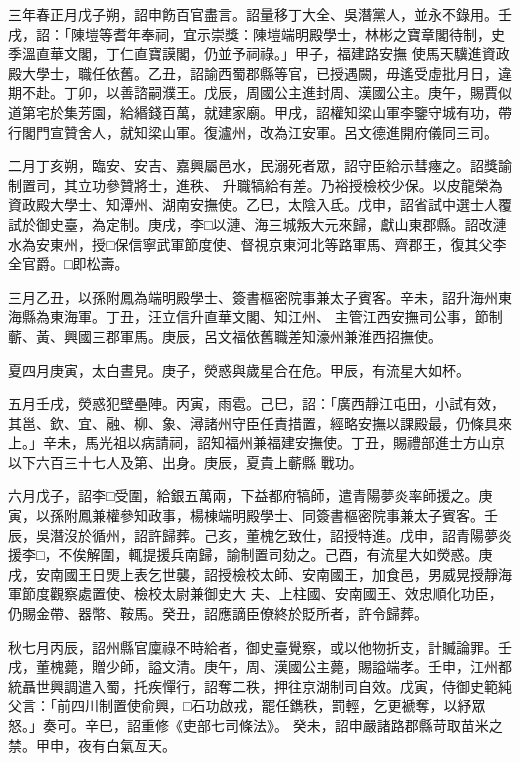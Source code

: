 \begin{pinyinscope}
 三年春正月戊子朔，詔申飭百官盡言。詔量移丁大全、吳潛黨人，並永不錄用。壬戌，詔：「陳塏等耆年奉祠，宜示崇獎：陳塏端明殿學士，林彬之寶章閣待制，史季溫直華文閣，丁仁直寶謨閣，仍並予祠祿。」甲子，福建路安撫
 使馬天驥進資政殿大學士，職任依舊。乙丑，詔諭西蜀郡縣等官，已授遇闕，毋遙受虛批月日，違期不赴。丁卯，以善諮嗣濮王。戊辰，周國公主進封周、漢國公主。庚午，賜賈似道第宅於集芳園，給緡錢百萬，就建家廟。甲戌，詔權知梁山軍李鑒守城有功，帶行閣門宣贊舍人，就知梁山軍。復瀘州，改為江安軍。呂文德進開府儀同三司。



 二月丁亥朔，臨安、安吉、嘉興屬邑水，民溺死者眾，詔守臣給示彗瘞之。詔獎諭制置司，其立功參贊將士，進秩、
 升職犒給有差。乃裕授檢校少保。以皮龍榮為資政殿大學士、知潭州、湖南安撫使。乙巳，太陰入氐。戊申，詔省試中選士人覆試於御史臺，為定制。庚戌，李□以漣、海三城叛大元來歸，獻山東郡縣。詔改漣水為安東州，授□保信寧武軍節度使、督視京東河北等路軍馬、齊郡王，復其父李全官爵。□即松壽。



 三月乙丑，以孫附鳳為端明殿學士、簽書樞密院事兼太子賓客。辛未，詔升海州東海縣為東海軍。丁丑，汪立信升直華文閣、知江州、
 主管江西安撫司公事，節制蘄、黃、興國三郡軍馬。庚辰，呂文福依舊職差知濠州兼淮西招撫使。



 夏四月庚寅，太白晝見。庚子，熒惑與歲星合在危。甲辰，有流星大如杯。



 五月壬戌，熒惑犯壁壘陣。丙寅，雨雹。己巳，詔：「廣西靜江屯田，小試有效，其邕、欽、宜、融、柳、象、潯諸州守臣任責措置，經略安撫以課殿最，仍條具來上。」辛未，馬光祖以病請祠，詔知福州兼福建安撫使。丁丑，賜禮部進士方山京以下六百三十七人及第、出身。庚辰，夏貴上蘄縣
 戰功。



 六月戊子，詔李□受圍，給銀五萬兩，下益都府犒師，遣青陽夢炎率師援之。庚寅，以孫附鳳兼權參知政事，楊棟端明殿學士、同簽書樞密院事兼太子賓客。壬辰，吳潛沒於循州，詔許歸葬。己亥，董槐乞致仕，詔授特進。戊申，詔青陽夢炎援李□，不俟解圍，輒提援兵南歸，諭制置司劾之。己酉，有流星大如熒惑。庚戌，安南國王日煚上表乞世襲，詔授檢校太師、安南國王，加食邑，男威晃授靜海軍節度觀察處置使、檢校太尉兼御史大
 夫、上柱國、安南國王、效忠順化功臣，仍賜金帶、器幣、鞍馬。癸丑，詔應謫臣僚終於貶所者，許令歸葬。



 秋七月丙辰，詔州縣官廩祿不時給者，御史臺覺察，或以他物折支，計贓論罪。壬戌，董槐薨，贈少師，謚文清。庚午，周、漢國公主薨，賜謚端孝。壬申，江州都統聶世興調遣入蜀，托疾憚行，詔奪二秩，押往京湖制司自效。戊寅，侍御史範純父言：「前四川制置使俞興，□石功啟戎，罷任鐫秩，罰輕，乞更褫奪，以紓眾怒。」奏可。辛巳，詔重修《吏部七司條法》。
 癸未，詔申嚴諸路郡縣苛取苗米之禁。甲申，夜有白氣亙天。




\end{pinyinscope}

